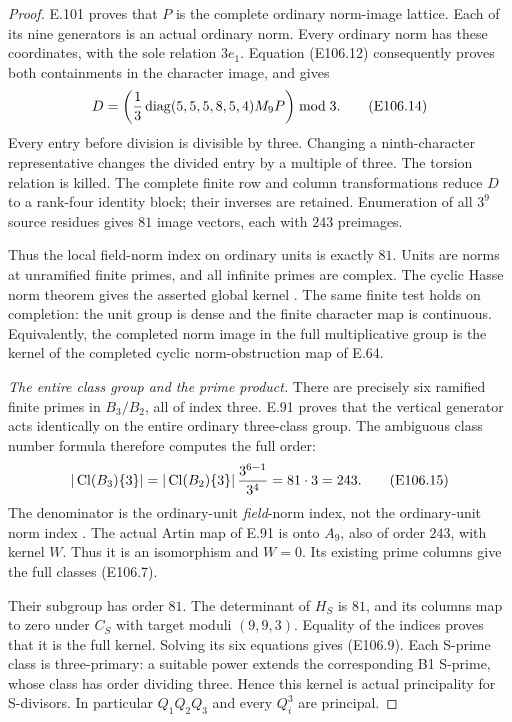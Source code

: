 \begin{proof}
E.101 proves that $P$ is the complete ordinary norm-image
lattice. Each of its nine generators is an actual ordinary
norm. Every ordinary norm has these coordinates, with the
sole relation $3e_1$. Equation (E106.12) consequently proves
both containments in the character image, and gives
\[
 D=\left({1\over3}\operatorname{diag}(5,5,5,8,5,4)M_9P\right)\bmod3.
 \tag{E106.14}
\]
Every entry before division is divisible by three. Changing
a ninth-character representative changes the divided entry
by a multiple of three. The torsion relation is killed.
The complete finite row and column transformations reduce
$D$ to a rank-four identity block; their inverses are
retained. Enumeration of all $3^9$ source residues gives
$81$ image vectors, each with $243$ preimages.

Thus the local field-norm index on ordinary units is
exactly $81$. Units are norms at unramified finite primes,
and all infinite primes are complex. The cyclic Hasse
norm theorem gives the asserted global kernel
\cite[VIII,Theorem3.1 and proof]{E_MilneCFT}.
The same finite test holds on completion: the unit group
is dense and the finite character map is continuous.
Equivalently, the completed norm image in the full
multiplicative group is the kernel of the completed
cyclic norm-obstruction map of E.64.

\emph{The entire class group and the prime product.}
There are precisely six ramified finite primes in
$B_3/B_2$, all of index three. E.91 proves that the vertical
generator acts identically on the entire ordinary three-class
group. The ambiguous class number formula therefore computes
the full order:
\[
 |\operatorname{Cl}(B_3)\{3\}|
  =|\operatorname{Cl}(B_2)\{3\}|\,{3^{6-1}\over3^4}
  =81\cdot3=243 .
 \tag{E106.15}
\]
The denominator is the ordinary-unit \emph{field}-norm
index, not the ordinary-unit norm index
\cite[Theorem1(1), with its ideal/Herbrand derivation]{E_LemmermeyerAmbiguous}.
The actual Artin map of E.91 is onto $A_9$, also of order
$243$, with kernel $W$. Thus it is an isomorphism and $W=0$.
Its existing prime columns give the full classes (E106.7).

Their subgroup has order $81$. The determinant of $H_S$
is $81$, and its columns map to zero under $C_S$ with
target moduli $(9,9,3)$. Equality of the indices proves
that it is the full kernel. Solving its six equations
gives (E106.9). Each S-prime class is three-primary:
a suitable power extends the corresponding B1 S-prime,
whose class has order dividing three. Hence this kernel
is actual principality for S-divisors. In particular
$Q_1Q_2Q_3$ and every $Q_i^3$ are principal.


\end{proof}
